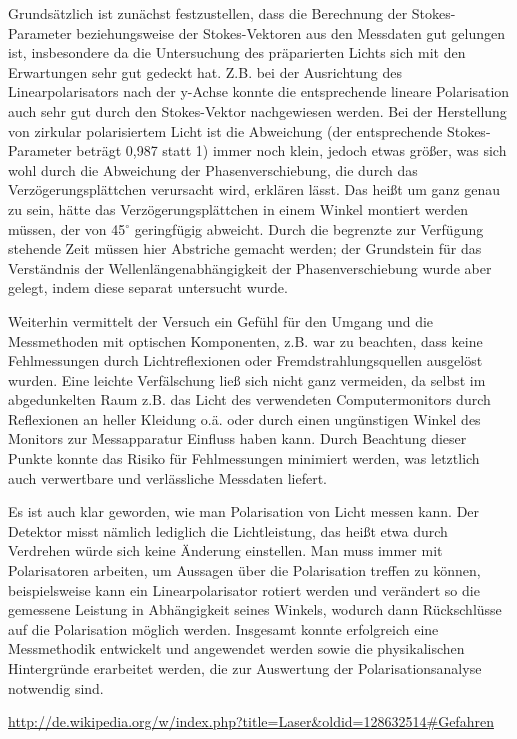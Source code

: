 \documentclass[bigchapter,colorback,accentcolor=tud4b,linedtoc,11pt]{tudreport}
\begin{document}
Grundsätzlich ist zunächst festzustellen, dass die Berechnung der Stokes-Parameter beziehungsweise der Stokes-Vektoren aus den Messdaten gut gelungen ist, insbesondere da die Untersuchung des präparierten Lichts sich mit den Erwartungen sehr gut gedeckt hat. Z.B. bei der Ausrichtung des Linearpolarisators nach der y-Achse konnte die entsprechende lineare Polarisation auch sehr gut durch den Stokes-Vektor nachgewiesen werden. Bei der Herstellung von zirkular polarisiertem Licht ist die Abweichung (der entsprechende Stokes-Parameter beträgt 0,987 statt 1) immer noch klein, jedoch etwas größer, was sich wohl durch die Abweichung der Phasenverschiebung, die durch das Verzögerungsplättchen verursacht wird, erklären lässt. Das heißt um ganz genau zu sein, hätte das Verzögerungsplättchen in einem Winkel montiert werden müssen, der von 45$^{\circ}$ geringfügig abweicht. Durch die begrenzte zur Verfügung stehende Zeit müssen hier Abstriche gemacht werden; der Grundstein für das Verständnis der Wellenlängenabhängigkeit der Phasenverschiebung wurde aber gelegt, indem diese separat untersucht wurde. 

Weiterhin vermittelt der Versuch ein Gefühl für den Umgang und die Messmethoden mit optischen Komponenten, z.B. war zu beachten, dass keine Fehlmessungen durch Lichtreflexionen oder Fremdstrahlungsquellen ausgelöst wurden. Eine leichte Verfälschung ließ sich nicht ganz vermeiden, da selbst im abgedunkelten Raum z.B. das Licht des verwendeten Computermonitors durch Reflexionen an heller Kleidung o.ä. oder durch einen ungünstigen Winkel des Monitors zur Messapparatur Einfluss haben kann. Durch Beachtung dieser Punkte konnte das Risiko für Fehlmessungen minimiert werden, was letztlich auch verwertbare und verlässliche Messdaten liefert.

Es ist auch klar geworden, wie man Polarisation von Licht messen kann. Der Detektor misst nämlich lediglich die Lichtleistung, das heißt etwa durch Verdrehen würde sich keine Änderung einstellen. Man muss immer mit Polarisatoren arbeiten, um Aussagen über die Polarisation treffen zu können, beispielsweise kann ein Linearpolarisator rotiert werden und verändert so die gemessene Leistung in Abhängigkeit seines Winkels, wodurch dann Rückschlüsse auf die Polarisation möglich werden. Insgesamt konnte erfolgreich eine Messmethodik entwickelt und angewendet werden sowie die physikalischen Hintergründe erarbeitet werden, die zur Auswertung der Polarisationsanalyse notwendig sind.
\cleardoublepage{}
\newpage
\begin{thebibliography}{100}
   \url{http://de.wikipedia.org/w/index.php?title=Laser&oldid=128632514#Gefahren}
\end{thebibliography}

\cleardoublepage{}
\end{document}
